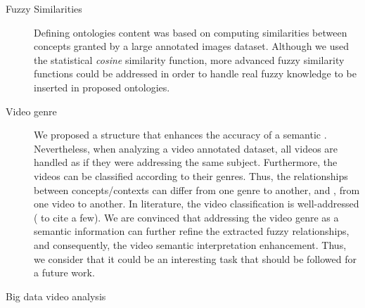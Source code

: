 \begin{description}
	\item[Fuzzy Similarities]   Defining ontologies content was based on computing similarities 
		between concepts granted by a large annotated images dataset. Although we used the 
		statistical \emph{cosine} similarity function, more advanced fuzzy similarity 
		functions \citep{Baccour2013,Baccour2014} could be addressed in order to handle real 
		fuzzy knowledge to be inserted in proposed ontologies.
	\item[Video genre]   We proposed a  structure that enhances the accuracy of a semantic .
		Nevertheless, when analyzing a video annotated dataset, all videos are handled as if they were addressing the same subject. 
		Furthermore, the videos can be classified according to their genres. Thus, the relationships between 
		concepts/contexts can differ from one genre to another, and , from one video to another.
		In literature, the video classification is well-addressed 
		(\citep{Wu2012, Huang2012, Chattopadhyay2013, Muneesawang2014} to cite a few). 
		We are convinced that addressing the video genre as a semantic information can 
		further refine the extracted fuzzy relationships, and consequently, the video semantic 
		interpretation enhancement. Thus, we consider that it could be an interesting task that 
		should be followed for a future work. 
	\item[Big data video analysis ] 
		 

\end{description}
